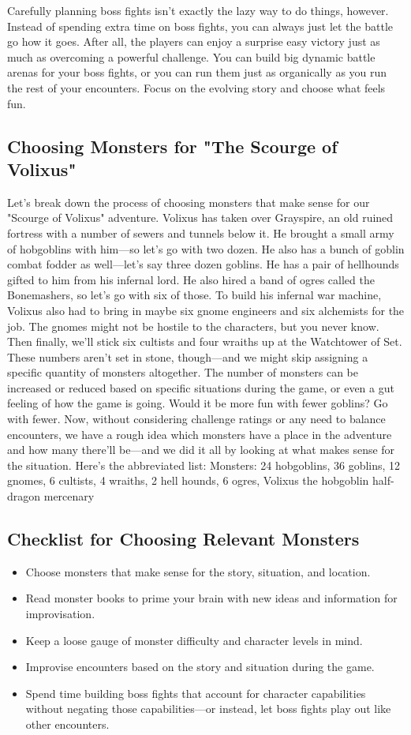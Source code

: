 \documentclass[10pt,a4paper,twoside,bg=print,twocolumn,openany,nodeprecatedcode]{dndbook}
\begin{document}
Carefully planning boss fights isn't exactly the lazy way to do things, however. Instead of spending extra time on boss fights, you can always just let the battle go how it goes. After all, the players can enjoy a surprise easy victory just as much as overcoming a powerful challenge. You can build big dynamic battle arenas for your boss fights, or you can run them just as organically as you run the rest of your encounters. Focus on the evolving story and choose what feels fun.
\subsection{Choosing Monsters for "The Scourge of Volixus"}
Let's break down the process of choosing monsters that make sense for our "Scourge of Volixus" adventure. Volixus has taken over Grayspire, an old ruined fortress with a number of sewers and tunnels below it. He brought a small army of hobgoblins with him—so let's go with two dozen. He also has a bunch of goblin combat fodder as well—let's say three dozen goblins. He has a pair of hellhounds gifted to him from his infernal lord. He also hired a band of ogres called the Bonemashers, so let's go with six of those.
To build his infernal war machine, Volixus also had to bring in maybe six gnome engineers and six alchemists for the job. The gnomes might not be hostile to the characters, but you never know. Then finally, we'll stick six cultists and four wraiths up at the Watchtower of Set.
These numbers aren't set in stone, though—and we might skip assigning a specific quantity of monsters altogether. The number of monsters can be increased or reduced based on specific situations during the game, or even a gut feeling of how the game is going. Would it be more fun with fewer goblins? Go with fewer.
Now, without considering challenge ratings or any need to balance encounters, we have a rough idea which monsters have a place in the adventure and how many there'll be—and we did it all by looking at what makes sense for the situation.
Here's the abbreviated list:
Monsters: 24 hobgoblins, 36 goblins, 12 gnomes, 6 cultists, 4 wraiths, 2 hell hounds, 6 ogres, Volixus the hobgoblin half-dragon mercenary
\subsection{Checklist for Choosing Relevant Monsters}

\begin{itemize}
\item Choose monsters that make sense for the story, situation, and location.
\item Read monster books to prime your brain with new ideas and information for improvisation.
\item Keep a loose gauge of monster difficulty and character levels in mind.
\item Improvise encounters based on the story and situation during the game.
\item Spend time building boss fights that account for character capabilities without negating those capabilities—or instead, let boss fights play out like other encounters.
\end{itemize}
\end{document}

